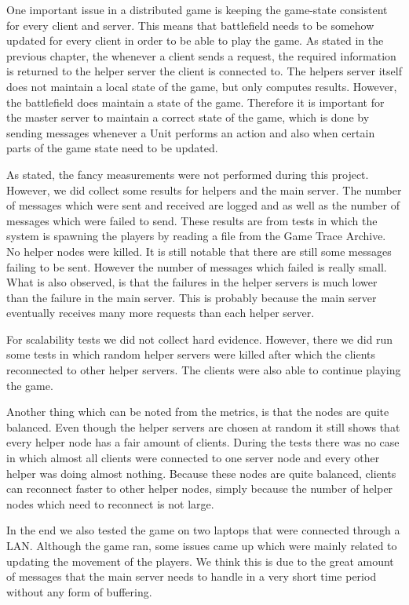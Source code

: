 One important issue in a distributed game is keeping the game-state consistent for every client and server.
This means that battlefield needs to be somehow updated for every client in order to be able to play the game.
As stated in the previous chapter, the whenever a client sends a request, the required information is returned to the helper server the client is connected to.
The helpers server itself does not maintain a local state of the game, but only computes results.
However, the battlefield does maintain a state of the game. 
Therefore it is important for the master server to maintain a correct state of the game, which is done by sending messages whenever a Unit performs an action and also when certain parts of the game state need to be updated.

As stated, the fancy measurements were not performed during this project. 
However, we did collect some results for helpers and the main server.
The number of messages which were sent and received are logged and as well as the number of messages which were failed to send.
These results are from tests in which the system is spawning the players by reading a file from the Game Trace Archive.
No helper nodes were killed.
It is still notable that there are still some messages failing to be sent. However the number of messages which failed is really small.
What is also observed, is that the failures in the helper servers is much lower than the failure in the main server.
This is probably because the main server eventually receives many more requests than each helper server.

For scalability tests we did not collect hard evidence. 
However, there we did run some tests in which random helper servers were killed after which the clients reconnected to other helper servers.
The clients were also able to continue playing the game.

Another thing which can be noted from the metrics, is that the nodes are quite balanced.
Even though the helper servers are chosen at random it still shows that every helper node has a fair amount of clients.
During the tests there was no case in which almost all clients were connected to one server node and every other helper was doing almost nothing.
Because these nodes are quite balanced, clients can reconnect faster to other helper nodes, simply because the number of helper nodes which need to reconnect is not large.

In the end we also tested the game on two laptops that were connected through a LAN. Although the game ran, some issues came up which were mainly related to updating the movement of the players. We think this is due to the great amount of messages that the main server needs to handle in a very short time period without any form of buffering.